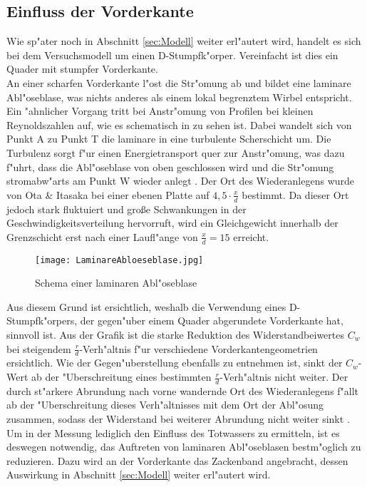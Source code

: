 \subsection{Einfluss der Vorderkante} 
\label{sec:Vorderkante}
Wie sp"ater noch in Abschnitt \ref{sec:Modell} weiter erl"autert wird, handelt es sich bei dem Versuchsmodell um einen D-Stumpfk"orper. Vereinfacht ist dies ein Quader mit stumpfer Vorderkante.\\ 
An einer scharfen Vorderkante l"ost die Str"omung ab und bildet eine laminare Abl"oseblase, was nichts anderes als einem lokal begrenztem Wirbel entspricht. Ein "ahnlicher Vorgang tritt bei Anstr"omung von Profilen bei kleinen Reynoldszahlen auf, wie es schematisch in  zu sehen ist. Dabei wandelt sich von Punkt A zu Punkt T die laminare in eine turbulente Scherschicht um. Die Turbulenz sorgt f"ur einen Energietransport quer zur Anstr"omung, was dazu f"uhrt, dass die Abl"oseblase von oben geschlossen wird und die Str"omung stromabw"arts am Punkt W wieder anlegt \cite{Siegman.2015}. Der Ort des Wiederanlegens wurde von Ota \& Itasaka \cite{Ota.1976} bei einer ebenen Platte auf $4,5 \cdot \frac{x}{d}$ bestimmt. Da dieser Ort jedoch stark fluktuiert und gro\ss{}e Schwankungen in der Geschwindigkeitsverteilung hervorruft, wird ein Gleichgewicht innerhalb der Grenzschicht erst nach einer Laufl"ange von $\frac{x}{d} = 15$ erreicht.
  
\begin{figure}[h]
	\centering
	\texttt{[image: LaminareAbloeseblase.jpg]}
	\caption{Schema einer laminaren Abl"oseblase \cite{Siegman.2015}}
	\label{fig:LamBlase}
\end{figure}

Aus diesem Grund ist ersichtlich, weshalb die Verwendung eines D-Stumpfk"orpers, der gegen"uber einem Quader abgerundete  Vorderkante hat, sinnvoll ist. Aus der Grafik  ist die starke Reduktion des Widerstandbeiwertes $C_w$ bei steigendem $\frac{r}{d}$-Verh"altnis f"ur verschiedene Vorderkantengeometrien ersichtlich. Wie der Gegen"uberstellung  ebenfalls zu entnehmen ist, sinkt der $C_w$-Wert ab der "Uberschreitung eines bestimmten $\frac{r}{d}$-Verh"altnis nicht weiter. Der durch st"arkere Abrundung nach vorne wandernde Ort des Wiederanlegens f"allt ab der "Uberschreitung dieses Verh"altnisses mit dem Ort der Abl"osung zusammen, sodass der Widerstand bei weiterer Abrundung nicht weiter sinkt \cite{Hucho.2011}. 
Um in der Messung lediglich den Einfluss des Totwassers zu ermitteln, ist es deswegen notwendig, das Auftreten von laminaren Abl"oseblasen bestm"oglich zu reduzieren. Dazu wird an der Vorderkante das Zackenband angebracht, dessen Auswirkung in Abschnitt \ref{sec:Modell} weiter erl"autert wird.

